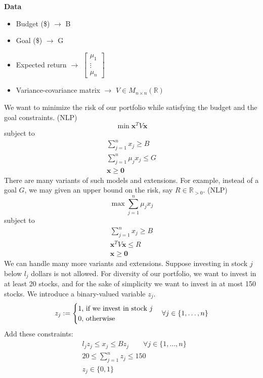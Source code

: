 \textbf{Data}
\begin{itemize}
    \item Budget (\$) $\rightarrow$ B
    \item Goal (\$) $\rightarrow$ G
    \item Expected return $\rightarrow$
    $\begin{bmatrix}
        \mu_1\\
        \vdots\\
        \mu_n
    \end{bmatrix}$
    \item Variance-covariance matrix $\rightarrow$ 
    $V\in M_{n\times n}(\mathbb{R})$
\end{itemize}
We want to minimize the risk of our portfolio while satisfying the budget and
the goal constraints. (NLP)
\[\min \mathbf{x}^T V\mathbf{x}\]
subject to
\begin{align*}
    \sum_{j = 1}^{n}x_j\ge B\\
    \sum_{j = 1}^{n}\mu_jx_j\le G\\
    \mathbf{x}\ge \mathbf{0}
\end{align*}
There are many variants of such models and extensions. For example, instead
of a goal $G$, we may given an upper bound on the risk, say 
$R\in\mathbb{R}_{>0}$. (NLP)
\[\max \sum_{j = 1}^{n}\mu_jx_j\]
subject to
\begin{align*}
    \sum_{j = 1}^{n}x_j\ge B\\
    \mathbf{x}^T V\mathbf{x}\le R\\
    \mathbf{x}\ge \mathbf{0}
\end{align*}
We can handle many more variants and extensions. Suppose investing in stock
$j$ below $l_j$ dollars is not allowed. For diversity of our portfolio, we
want to invest in at least 20 stocks, and for the sake of simplicity we want
to invest in at most 150 stocks. We introduce a binary-valued variable $z_j$.
\[z_j:=
\begin{cases}
    1 \text{, if we invest in stock $j$}\\
    0 \text{, otherwise}
\end{cases}
\forall j\in\{1,\dots,n\}\\
\]
Add these constraints:
\begin{align*}
    &l_jz_j\le x_j\le Bz_j\qquad \forall j\in\{1,\dots,n\}\\
    &20\le \sum_{j = 1}^{n}z_j\le 150\\
    &z_j\in\{0,1\}
\end{align*}

